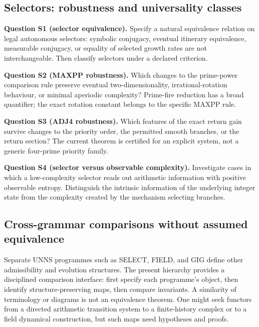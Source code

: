 \documentclass[11pt,a4paper]{article}
\theoremstyle{definition}\newtheorem{definition}[theorem]{Definition}
\begin{document}
\subsection{Selectors: robustness and universality classes}
\textbf{Question S1 (selector equivalence).} Specify a natural equivalence relation on legal autonomous selectors: symbolic conjugacy, eventual itinerary equivalence, measurable conjugacy, or equality of selected growth rates are not interchangeable. Then classify selectors under a declared criterion.

\textbf{Question S2 (MAXPP robustness).} Which changes to the prime-power comparison rule preserve eventual two-dimensionality, irrational-rotation behaviour, or minimal aperiodic complexity? Prime-fire reduction has a broad quantifier; the exact rotation constant belongs to the specific MAXPP rule.

\textbf{Question S3 (ADJ4 robustness).} Which features of the exact return gain survive changes to the priority order, the permitted smooth branches, or the return section? The current theorem is certified for an explicit system, not a generic four-prime priority family.

\textbf{Question S4 (selector versus observable complexity).} Investigate cases in which a low-complexity selector reads out arithmetic information with positive observable entropy. Distinguish the intrinsic information of the underlying integer state from the complexity created by the mechanism selecting branches.

\subsection{Cross-grammar comparisons without assumed equivalence}
Separate UNNS programmes such as SELECT, FIELD, and GIG define other admissibility and evolution structures. The present hierarchy provides a disciplined comparison interface: first specify each programme's object, then identify structure-preserving maps, then compare invariants. A similarity of terminology or diagrams is not an equivalence theorem. One might seek functors from a directed arithmetic transition system to a finite-history complex or to a field dynamical construction, but such maps need hypotheses and proofs.
\end{document}

